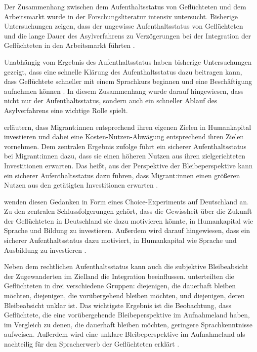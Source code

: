 Der Zusammenhang zwischen dem Aufenthaltsstatus von Geflüchteten und dem Arbeitsmarkt wurde in der Forschungsliteratur intensiv untersucht. Bisherige Untersuchungen zeigen, dass der ungewisse Aufenthaltsstatus von Geflüchteten und die lange Dauer des Asylverfahrens zu Verzögerungen bei der Integration der Geflüchteten in den Arbeitsmarkt führten \parencites{article}{doi:10.1126/sciadv.1600432}.

Unabhängig vom Ergebnis des Aufenthaltsstatus haben bisherige Untersuchungen gezeigt, dass eine schnelle Klärung des Aufenthaltsstatus dazu beitragen kann, dass Geflüchtete schneller mit einem Sprachkurs beginnen und eine Beschäftigung aufnehmen können \parencite{kosyakova2020role}. In diesem Zusammenhang wurde darauf hingewiesen, dass nicht nur der Aufenthaltsstatus, sondern auch ein schneller Ablauf des Asylverfahrens eine wichtige Rolle spielt. 

\textcite{10.1257/aer.89.2.186} erläutern, dass Migrant:innen entsprechend ihren eigenen Zielen in Humankapital investieren und dabei eine Kosten-Nutzen-Abwägung entsprechend ihren Zielen vornehmen. Dem zentralen Ergebnis zufolge führt ein sicherer Aufenthaltsstatus bei Migrant:innen dazu, dass sie einen höheren Nutzen aus ihren zielgerichteten Investitionen erwarten. Das heißt, aus der Perspektive der Bleibeperspektive kann ein sicherer Aufenthaltsstatus dazu führen, dass Migrant:innen einen größeren Nutzen aus den getätigten Investitionen erwarten \parencite{10.1257/aer.89.2.186}.

\textcite{repec:iab:iabdpa:202031} wenden diesen Gedanken in Form eines Choice-Experiments auf Deutschland an. Zu den zentralen Schlussfolgerungen gehört, dass die Gewissheit über die Zukunft der Geflüchteten in Deutschland sie dazu motivieren könnte, in Humankapital wie Sprache und Bildung zu investieren. Außerdem wird darauf hingewiesen, dass ein sicherer Aufenthaltsstatus dazu motiviert, in Humankapital wie Sprache und Ausbildung zu investieren \parencite{repec:iab:iabdpa:202031}.

Neben dem rechtlichen Aufenthaltsstatus kann auch die subjektive Bleibeabsicht der Zugewanderten im Zielland die Integration beeinflussen. \textcite{doi:10.1177/09500170261425857} unterteilten die Geflüchteten in drei verschiedene Gruppen: diejenigen, die dauerhaft bleiben möchten, diejenigen, die vorübergehend bleiben möchten, und diejenigen, deren Bleibeabsicht unklar ist. Das wichtigste Ergebnis ist die Beobachtung, dass Geflüchtete, die eine vorübergehende Bleibeperspektive im Aufnahmeland haben, im Vergleich zu denen, die dauerhaft bleiben möchten, geringere Sprachkenntnisse aufweisen. Außerdem wird eine unklare Bleibeperspektive im Aufnahmeland als nachteilig für den Spracherwerb der Geflüchteten erklärt \parencite{doi:10.1177/09500170261425857}.

